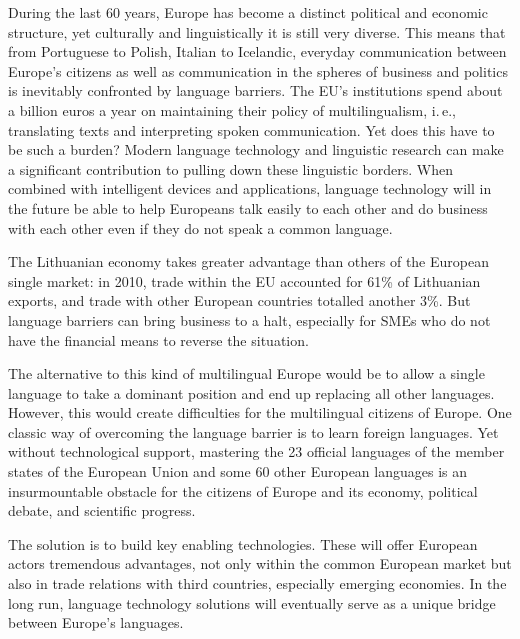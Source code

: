\begin{multicols}{2}

During the last 60 years, Europe has become a distinct political and economic structure, yet culturally and linguistically it is still very diverse. This means that from Portuguese to Polish, Italian to Icelandic, everyday communication between Europe’s citizens as well as communication in the spheres of business and politics is inevitably confronted by language barriers. The EU’s institutions spend about a billion euros a year on maintaining their policy of multilingualism, i.\,e., translating texts and interpreting spoken communication. Yet does this have to be such a burden? Modern language technology and linguistic research can make a significant contribution to pulling down these linguistic borders. When combined with intelligent devices and applications, language technology will in the future be able to help Europeans talk easily to each other and do business with each other even if they do not speak a common language.


The Lithuanian economy takes greater advantage than others of the European single market: in 2010, trade within the EU accounted for 61\% of Lithuanian exports, and trade with other European countries totalled another 3\%. But language barriers can bring business to a halt, especially for SMEs who do not have the financial means to reverse the situation.

The alternative to this kind of multilingual Europe would be to allow a single language to take a dominant position and end up replacing all other languages. However, this would create difficulties for the multilingual citizens of Europe.
One classic way of overcoming the language barrier is to learn foreign languages. Yet without technological support, mastering the 23 official languages of the member states of the European Union and some 60 other European languages is an insurmountable obstacle for the citizens of Europe and its economy, political debate, and scientific progress.

The solution is to build key enabling technologies. These will offer European actors tremendous advantages, not only within the common European market but also in trade relations with third countries, especially emerging economies. In the long run, language technology solutions will eventually serve as a unique bridge between Europe’s languages.



\end{multicols}
